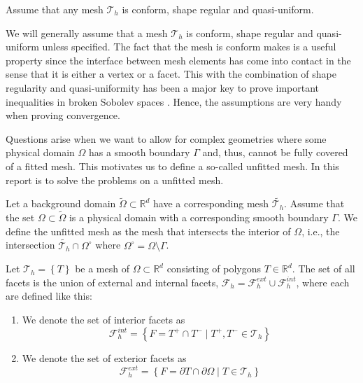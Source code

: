 \begin{assumption}
Assume that any mesh $\mathcal{T}_{h} $ is conform, shape regular and quasi-uniform.
\end{assumption}





We will generally assume that a mesh $\mathcal{T}_{h} $ is conform, shape regular and quasi-uniform unless specified.
 The fact that the mesh is conform makes is a useful property since the interface between mesh elements has come into contact in the sense
that it is either a vertex or a facet. This with the combination of shape regularity and quasi-uniformity has been a major key to prove important inequalities in broken Sobolev spaces \cite[Chapter 1.4.1]{pietro2012}. Hence, the assumptions are
very handy when proving convergence.

Questions arise when we want to allow for complex geometries where some physical domain $\Omega $ has a smooth boundary $\Gamma $ and, thus, cannot be fully covered of a fitted mesh. This motivates us to define a so-called unfitted mesh. In this
report is  to solve the problems on a unfitted mesh.

\begin{definition}
 Let a background domain $\widetilde{\Omega } \subset \mathbb{R} ^{d} $ have a corresponding mesh $\widetilde{\mathcal{T} _{h}}$.
Assume that the set $\Omega\subset   \widetilde{\Omega }  $ is a physical domain with a corresponding smooth boundary $\Gamma$. We define the unfitted mesh as the mesh that intersects the interior of $\Omega$, i.e., the intersection $\widetilde{\mathcal{T}_{h} } \cap
 \Omega^{\circ }     $ where $ \Omega ^{\circ } = \Omega \setminus \Gamma  $.
\end{definition}


\begin{definition}[Facets]
Let $\mathcal{T}_{h}  = \left\{ T \right\} $ be a mesh of $\Omega \subset  \mathbb{R} ^d $ consisting of polygons $T \in \mathbb{R} ^{d}$.
The set of all facets is the union of external and internal facets, $\mathcal{F} _{h} = \mathcal{F} ^{ext}_{h} \cup \mathcal{F} _{h}^{int} $, where each are defined like this:
\begin{enumerate}[label=\arabic*)]
    \item We denote the set of interior facets as \[
            \mathcal{F}^{int} _{h} = \left\{ F=T^{+}\cap T^{-}  \mid  T^{+}, T^{-} \in \mathcal{T}_{h}  \right\}
\]
\item We denote the set of exterior facets as
\[
            \mathcal{F}^{ext} _{h} = \left\{ F= \partial T \cap \partial \Omega    \mid  T  \in \mathcal{T}_{h}  \right\}
\]
\end{enumerate}
\end{definition}


